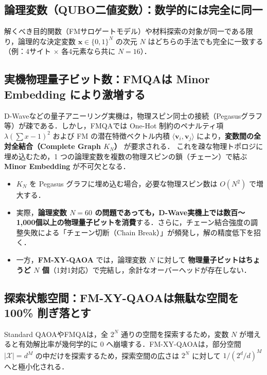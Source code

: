 \documentclass[11pt,a4paper]{ltjsarticle}
\begin{document}
\vspace{-2mm}
\subsection{論理変数（QUBO二値変数）：数学的には完全に同一}
解くべき目的関数（FMサロゲートモデル）や材料探索の対象が同一である限り，論理的な決定変数 $\bm{x} \in \{0, 1\}^N$ の次元 $N$ はどちらの手法でも完全に一致する（例：4サイト $\times$ 各4元素なら共に $N = 16$）．

\subsection{実機物理量子ビット数：FMQAは Minor Embedding により激増する}
D-Waveなどの量子アニーリング実機は，物理スピン同士の接続（Pegasusグラフ等）が疎である．しかし，FMQAでは One-Hot 制約のペナルティ項 $\lambda (\sum x - 1)^2$ および FM の潜在特徴ベクトル内積 $\langle \bm{v}_i, \bm{v}_j \rangle$ により，\textbf{変数間の全対全結合（Complete Graph $K_N$）} が要求される．
これを疎な物理トポロジに埋め込むため，1 つの論理変数を複数の物理スピンの鎖（チェーン）で結ぶ \textbf{Minor Embedding} が不可欠となる．
\begin{itemize}\setlength{\itemsep}{1pt}
    \item $K_N$ を Pegasus グラフに埋め込む場合，必要な物理スピン数は $O(N^2)$ で増大する．
    \item 実際，\textbf{論理変数 $N=60$ の問題であっても，D-Wave実機上では数百〜1,000個以上の物理量子ビットを消費}する．さらに，チェーン結合強度の調整失敗による「チェーン切断（Chain Break）」が頻発し，解の精度低下を招く．
    \item 一方，\textbf{FM-XY-QAOA} では，論理変数 $N$ に対して \textbf{物理量子ビットはちょうど $N$ 個}（1対1対応）で完結し，余計なオーバーヘッドが存在しない．
\end{itemize}

\subsection{探索状態空間：FM-XY-QAOAは無駄な空間を 100\% 削ぎ落とす}
Standard QAOAやFMQAは，全 $2^N$ 通りの空間を探索するため，変数 $N$ が増えると有効解比率が幾何学的に 0 へ崩壊する．FM-XY-QAOAは，部分空間 $|\mathcal{X}| = d^M$ の中だけを探索するため，探索空間の広さは $2^N$ に対して $1 / (2^d / d)^M$ へと極小化される．

\clearpage

\end{document}
